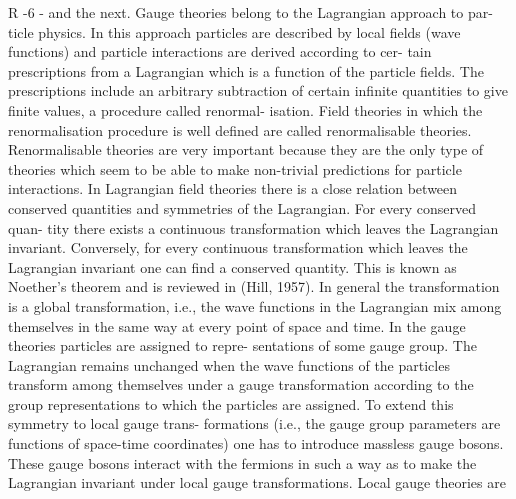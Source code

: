 \documentclass[twoside]{article}
\begin{document}
R -6 -
and the next. Gauge theories belong to the Lagrangian approach to par-
ticle physics. In this approach particles are described by local fields
(wave functions) and particle interactions are derived according to cer-
tain prescriptions from a Lagrangian which is a function of the particle
fields. The prescriptions include an arbitrary subtraction of certain
infinite quantities to give finite values, a procedure called renormal-
isation. Field theories in which the renormalisation procedure is well
defined are called renormalisable theories. Renormalisable theories are
very important because they are the only type of theories which seem to
be able to make non-trivial predictions for particle interactions. In
Lagrangian field theories there is a close relation between conserved
quantities and symmetries of the Lagrangian. For every conserved quan-
tity there exists a continuous transformation which leaves the Lagrangian
invariant. Conversely, for every continuous transformation which leaves
the Lagrangian invariant one can find a conserved quantity. This is
known as Noether's theorem and is reviewed in (Hill, 1957). In general
the transformation is a global transformation, i.e., the wave functions
in the Lagrangian mix among themselves in the same way at every point of
space and time. In the gauge theories particles are assigned to repre-
sentations of some gauge group. The Lagrangian remains unchanged when
the wave functions of the particles transform among themselves under a
gauge transformation according to the group representations to which the
particles are assigned. To extend this symmetry to local gauge trans-
formations (i.e., the gauge group parameters are functions of space-time
coordinates) one has to introduce massless gauge bosons. These gauge
bosons interact with the fermions in such a way as to make the Lagrangian
invariant under local gauge transformations. Local gauge theories are
\end{document}
